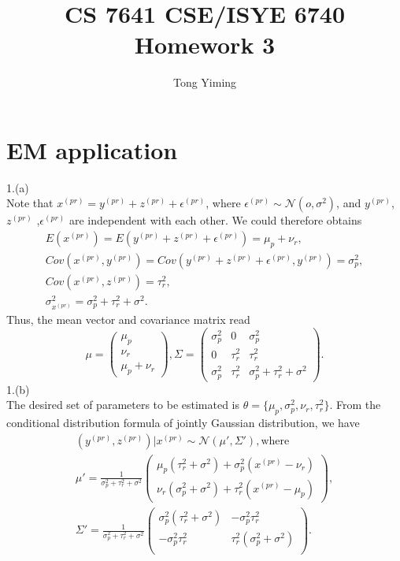 \documentclass{article}
\title{CS 7641 CSE/ISYE 6740 Homework 3}
\author{Tong Yiming}
\date{}
\begin{document}
\maketitle
\section{EM application}
1.(a)\\
Note that $x^{(pr)} = y^{(pr)} + z^{(pr)} + \epsilon^{(pr)}$, where $\epsilon^{(pr)}\sim\mathcal{N}(o, \sigma^2)$, and $y^{(pr)}$, $z^{(pr)}$ ,$\epsilon^{(pr)}$ are independent with each other. We could therefore obtains
\begin{gather*}
E(x^{(pr)}) = E(y^{(pr)} + z^{(pr)} + \epsilon^{(pr)}) = \mu_p + \nu_r,\\
Cov(x^{(pr)}, y^{(pr)}) = Cov(y^{(pr)} + z^{(pr)} + \epsilon^{(pr)}, y^{(pr)}) = \sigma_p^2,\\
Cov(x^{(pr)}, z^{(pr)}) = \tau_r^2,\\
\sigma^2_{x^{(pr)}} = \sigma_p^2 + \tau_r^2 + \sigma^2.
\end{gather*}
Thus, the mean vector and covariance matrix read
\begin{equation*}
\mu=\left(
\begin{matrix}
\mu_p\\
\nu_r\\
\mu_p + \nu_r
\end{matrix}
\right),
\Sigma=\left(
\begin{matrix}
\sigma_p^2& 0& \sigma_p^2\\
0 & \tau_r^2& \tau_r^2\\
\sigma_p^2& \tau_r^2& \sigma_p^2 + \tau_r^2 + \sigma^2
\end{matrix}
\right).
\end{equation*}
1.(b)\\
The desired set of parameters to be estimated is $\theta = \{\mu_p, \sigma_p^2, \nu_r, \tau_r^2\}$.
From the conditional distribution formula of jointly Gaussian distribution, we have 
\begin{gather*}
(y^{(pr)}, z^{(pr)})| x^{(pr)} \sim \mathcal{N}(\mu', \Sigma'), \text{where}\\
\mu'=\frac{1}{\sigma_p^2 + \tau_r^2 + \sigma^2}\left(
\begin{matrix}
\mu_p(\tau_r^2 + \sigma^2) + \sigma_p^2(x^{(pr)} - \nu_r)\\
\nu_r(\sigma_p^2 + \sigma^2) + \tau_r^2(x^{(pr)} - \mu_p)
\end{matrix}
\right),\\
\Sigma'=\frac{1}{\sigma_p^2 + \tau_r^2 + \sigma^2}\left(
\begin{matrix}
\sigma_p^2(\tau_r^2 + \sigma^2)& -\sigma_p^2\tau_r^2\\
-\sigma_p^2\tau_r^2 & \tau_r^2(\sigma_p^2 + \sigma^2)\\
\end{matrix}
\right).
\end{gather*}
\end{document}
